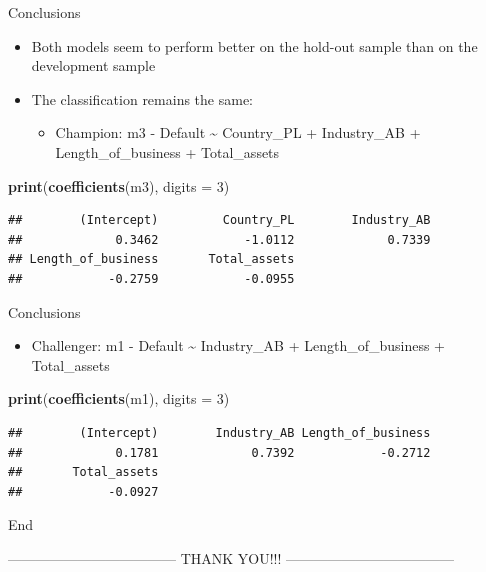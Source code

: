 \documentclass[9pt,ignorenonframetext,]{beamer}
\newenvironment{Shaded}{\begin{snugshade}}{\end{snugshade}}
\newcommand{\KeywordTok}[1]{\textcolor[rgb]{0.13,0.29,0.53}{\textbf{#1}}}
\newcommand{\DataTypeTok}[1]{\textcolor[rgb]{0.13,0.29,0.53}{#1}}
\newcommand{\DecValTok}[1]{\textcolor[rgb]{0.00,0.00,0.81}{#1}}
\newcommand{\NormalTok}[1]{#1}
\providecommand{\tightlist}{%
  \setlength{\itemsep}{0pt}\setlength{\parskip}{0pt}}
\begin{document}
\begin{frame}[fragile]{Conclusions}

\begin{itemize}
\tightlist
\item
  Both models seem to perform better on the hold-out sample than on the
  development sample
\item
  The classification remains the same:

  \begin{itemize}
  \tightlist
  \item
    Champion: m3 - Default \textasciitilde{} Country\_PL + Industry\_AB
    + Length\_of\_business + Total\_assets
  \end{itemize}
\end{itemize}

\begin{Shaded}
\begin{Highlighting}[]
\KeywordTok{print}\NormalTok{(}\KeywordTok{coefficients}\NormalTok{(m3), }\DataTypeTok{digits =} \DecValTok{3}\NormalTok{)}
\end{Highlighting}
\end{Shaded}

\begin{verbatim}
##        (Intercept)         Country_PL        Industry_AB 
##             0.3462            -1.0112             0.7339 
## Length_of_business       Total_assets 
##            -0.2759            -0.0955
\end{verbatim}

\end{frame}

\begin{frame}[fragile]{Conclusions}

\begin{itemize}
\tightlist
\item
  Challenger: m1 - Default \textasciitilde{} Industry\_AB +
  Length\_of\_business + Total\_assets
\end{itemize}

\begin{Shaded}
\begin{Highlighting}[]
\KeywordTok{print}\NormalTok{(}\KeywordTok{coefficients}\NormalTok{(m1), }\DataTypeTok{digits =} \DecValTok{3}\NormalTok{)}
\end{Highlighting}
\end{Shaded}

\begin{verbatim}
##        (Intercept)        Industry_AB Length_of_business 
##             0.1781             0.7392            -0.2712 
##       Total_assets 
##            -0.0927
\end{verbatim}

\end{frame}

\begin{frame}{End}

------------------------------------ THANK YOU!!!
------------------------------------

\end{frame}
\end{document}
